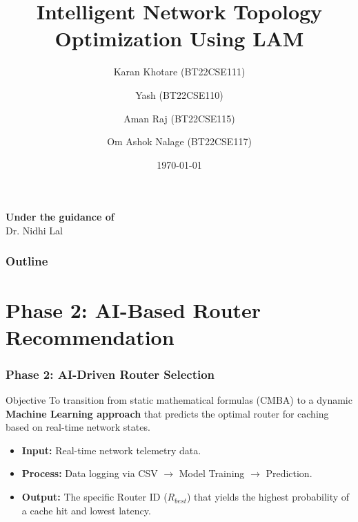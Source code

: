 \documentclass{beamer}
\title[Intelligent Network Topology Optimization]{Intelligent Network Topology Optimization Using LAM}
\author{Karan Khotare (BT22CSE111) \and Yash (BT22CSE110) \and Aman Raj (BT22CSE115) \and Om Ashok Nalage (BT22CSE117)}
\institute{Department of Computer Science and Engineering}
\date{\today}
\begin{document}
\begin{frame}
  \maketitle
  \begin{center}
    \vspace{1cm}
    \large
    \textbf{Under the guidance of} \\
    Dr. Nidhi Lal
  \end{center}
\end{frame}

\begin{frame}
  \frametitle{Outline}
  \tableofcontents
\end{frame}


\section{Phase 2: AI-Based Router Recommendation}

\begin{frame}
  \frametitle{Phase 2: AI-Driven Router Selection}
  \begin{block}{Objective}
    To transition from static mathematical formulas (CMBA) to a dynamic \textbf{Machine Learning approach} that predicts the optimal router for caching based on real-time network states.
  \end{block}
  
  \begin{itemize}
      \item \textbf{Input:} Real-time network telemetry data.
      \item \textbf{Process:} Data logging via CSV $\rightarrow$ Model Training $\rightarrow$ Prediction.
      \item \textbf{Output:} The specific Router ID ($R_{best}$) that yields the highest probability of a cache hit and lowest latency.
  \end{itemize}
\end{frame}
\end{document}
